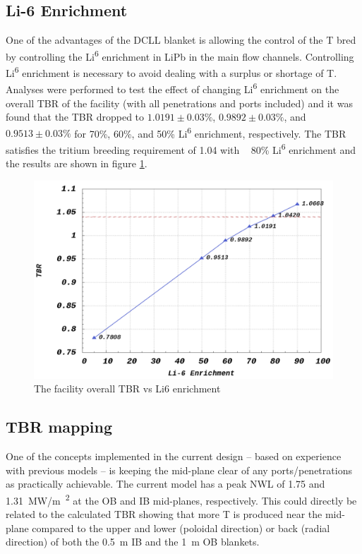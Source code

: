\documentclass[12pt, letterpaper]{elsarticle}
\begin{document}
\subsection{Li-6 Enrichment} \label{Li-6 Enrichment}
One of the advantages of the DCLL blanket is allowing the control of the T bred by controlling the  Li\textsuperscript{6} enrichment in LiPb in the main flow channels. Controlling Li\textsuperscript{6} enrichment is necessary to avoid dealing with a surplus or shortage of T. Analyses were performed to test the effect of changing Li\textsuperscript{6} enrichment on the overall TBR of the facility (with all penetrations and ports included) and it was found that the TBR dropped to $1.0191\pm 0.03\%$, $0.9892\pm 0.03\%$, and $0.9513\pm 0.03\%$ for 70\%, 60\%, and 50\% Li\textsuperscript{6} enrichment, respectively. The TBR satisfies the tritium breeding requirement of 1.04 with ~ 80\% Li\textsuperscript{6} enrichment and the results are shown in figure \ref{fig:Li6_enrichment}.
\begin{figure}[h!]
  \centering
  \includegraphics[scale=0.2]{../plots/Li6_enrichment.png}
  \caption{The facility overall TBR vs Li6 enrichment}
  \label{fig:Li6_enrichment}
\end{figure}

\subsection{TBR mapping} \label{TBR mapping}
One of the concepts implemented in the current design – based on experience with previous models – is keeping the mid-plane clear of any ports/penetrations as practically achievable. The current model has a peak NWL of 1.75 and \SI{1.31}{MW/m\textsuperscript{2}} at the OB and IB mid-planes, respectively. This could directly be related to the calculated TBR showing that more T is produced near the mid-plane compared to the upper and lower (poloidal direction) or back (radial direction) of both the \SI{0.5}{m} IB and the \SI{1}{m} OB blankets.\vspace{5mm}
\end{document}

